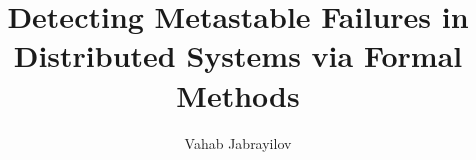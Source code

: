 \documentclass[sigplan,screen,10pt]{acmart}
\begin{document}
\title{Detecting Metastable Failures in Distributed Systems via Formal Methods}

\author{Vahab Jabrayilov}



\maketitle
\pagestyle{plain}












% 



\end{document}
